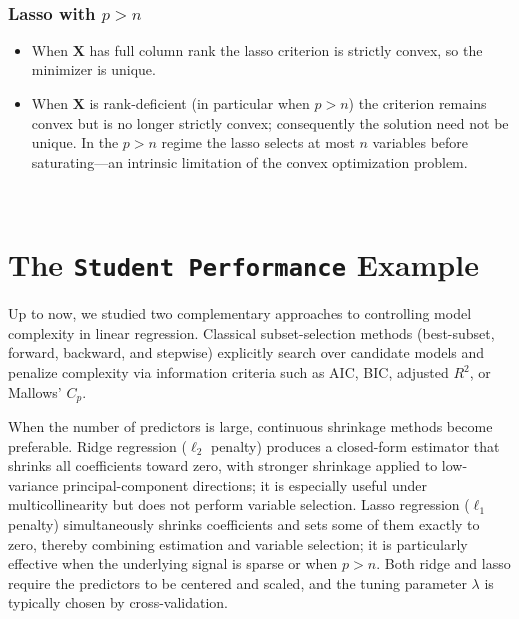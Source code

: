 \documentclass[
]{book}
\begin{document}
~

\subsubsection*{\texorpdfstring{Lasso with \(p>n\)}{Lasso with p\textgreater n}}\label{lasso-with-pn}

\begin{itemize}
\item
  When \(\mathbf{X}\) has full column rank the lasso criterion is strictly convex, so the minimizer is unique.
\item
  When \(\mathbf{X}\) is rank-deficient (in particular when \(p>n\)) the criterion remains convex but is no longer strictly convex; consequently the solution need not be unique. In the \(p>n\) regime the lasso selects at most \(n\) variables before saturating---an intrinsic limitation of the convex optimization problem.
\end{itemize}

~

\section{\texorpdfstring{The \texttt{Student\ Performance} Example}{The Student Performance Example}}\label{the-student-performance-example}

Up to now, we studied two complementary approaches to controlling model complexity in linear regression. Classical subset-selection methods (best-subset, forward, backward, and stepwise) explicitly search over candidate models and penalize complexity via information criteria such as AIC, BIC, adjusted \(R^2\), or Mallows' \(C_p\).

When the number of predictors is large, continuous shrinkage methods become preferable. Ridge regression (\(\ell_2\) penalty) produces a closed-form estimator that shrinks all coefficients toward zero, with stronger shrinkage applied to low-variance principal-component directions; it is especially useful under multicollinearity but does not perform variable selection. Lasso regression (\(\ell_1\) penalty) simultaneously shrinks coefficients and sets some of them exactly to zero, thereby combining estimation and variable selection; it is particularly effective when the underlying signal is sparse or when \(p>n\). Both ridge and lasso require the predictors to be centered and scaled, and the tuning parameter \(\lambda\) is typically chosen by cross-validation.
\end{document}
